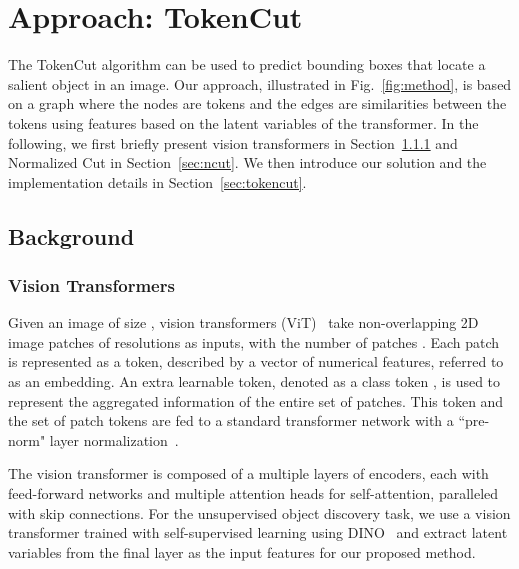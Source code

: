 \documentclass[twocolumn]{article}
\begin{document}
\section{Approach: TokenCut}
\label{sec:approach}

The TokenCut algorithm can be used to predict bounding boxes that locate a salient object in an image. Our approach, illustrated in Fig.~\ref{fig:method}, is based on a graph where the nodes are tokens and the edges are similarities between the tokens using features based on the latent variables of the transformer.
In the following, we first briefly present vision transformers in Section~\ref{sec:visiontransformers} and Normalized Cut in Section~\ref{sec:ncut}. We then introduce our solution and the implementation details in Section~\ref{sec:tokencut}.

\subsection{Background}
\subsubsection{Vision Transformers}
\label{sec:visiontransformers}
Given an image of size , vision transformers (ViT)~\cite{dosovitskiy2020image} take non-overlapping 2D image patches of resolutions  as inputs, with the number of patches . 
Each patch is represented as a token, described by a vector of numerical features, referred to as an embedding. An extra learnable token, denoted as a class token , is used to represent the aggregated information of the entire set of patches. This  token and the set of patch tokens are fed to a standard transformer network with a ``pre-norm" layer normalization~\cite{ba2016layer}.

The vision transformer is composed of a multiple layers of encoders, each with feed-forward networks and multiple attention heads for self-attention, paralleled with skip connections. For the unsupervised object discovery task, we use a vision transformer trained with self-supervised learning  using DINO~\cite{caron2021emerging} and extract latent variables from the final layer as the input features for our proposed method.
\end{document}
